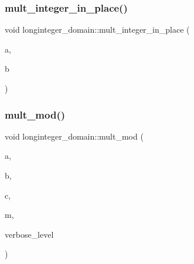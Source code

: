 \mbox{\label{classlonginteger__domain_a02a15ae41f4c5a6144267a1bbdafe038}} 
\subsubsection{\texorpdfstring{mult\+\_\+integer\+\_\+in\+\_\+place()}{mult\_integer\_in\_place()}}
{\footnotesize\ttfamily void longinteger\+\_\+domain\+::mult\+\_\+integer\+\_\+in\+\_\+place (\begin{DoxyParamCaption}\item[{\mbox{\hyperlink{classlonginteger__object}{longinteger\+\_\+object}} \&}]{a,  }\item[{\mbox{\hyperlink{galois_8h_a09fddde158a3a20bd2dcadb609de11dc}{I\+NT}}}]{b }\end{DoxyParamCaption})}

\mbox{\label{classlonginteger__domain_aca5463c0638b878951502ec9c5f811da}} 
\subsubsection{\texorpdfstring{mult\+\_\+mod()}{mult\_mod()}}
{\footnotesize\ttfamily void longinteger\+\_\+domain\+::mult\+\_\+mod (\begin{DoxyParamCaption}\item[{\mbox{\hyperlink{classlonginteger__object}{longinteger\+\_\+object}} \&}]{a,  }\item[{\mbox{\hyperlink{classlonginteger__object}{longinteger\+\_\+object}} \&}]{b,  }\item[{\mbox{\hyperlink{classlonginteger__object}{longinteger\+\_\+object}} \&}]{c,  }\item[{\mbox{\hyperlink{classlonginteger__object}{longinteger\+\_\+object}} \&}]{m,  }\item[{\mbox{\hyperlink{galois_8h_a09fddde158a3a20bd2dcadb609de11dc}{I\+NT}}}]{verbose\+\_\+level }\end{DoxyParamCaption})}

